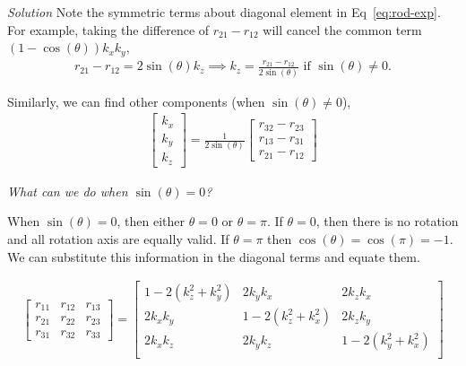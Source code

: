 \documentclass{article}
\numberwithin{prob}{section}
\newenvironment{solution}{\emph{Solution}}{}
\begin{document}
\begin{solution}
Note the symmetric terms about diagonal element in Eq~\eqref{eq:rod-exp}. For example, taking the difference of $r_{21} - r_{12}$ will cancel the common term $(1-\cos(\theta)) k_x k_y$,
\begin{align}
  r_{21} - r_{12} = 2\sin(\theta)k_z \implies k_z = \frac{r_{21} - r_{12}}{2\sin(\theta)} \text{ if } \sin(\theta) \neq 0.
\end{align}

Similarly, we can find other components (when $\sin(\theta) \neq 0$),
\begin{align}
  \begin{bmatrix}
    k_x \\ k_y \\ k_z
  \end{bmatrix} 
  = \frac{1}{2\sin(\theta)}\begin{bmatrix}
    r_{32} - r_{23} \\ r_{13} - r_{31} \\ r_{21} - r_{12}
  \end{bmatrix}
\end{align}

\emph{What can we do when $\sin(\theta) = 0$? }

When $\sin(\theta) = 0$, then either $\theta = 0$ or $\theta = \pi$. If $\theta = 0$, then there is no rotation and all rotation axis are equally valid. If $\theta = \pi$ then $\cos(\theta) = \cos(\pi) = -1$. We can substitute this information in the diagonal terms and equate them. 

\begin{align}
  \begin{bmatrix}
    r_{11} & r_{12} & r_{13}  \\
    r_{21} & r_{22} & r_{23}  \\
    r_{31} & r_{32} & r_{33}  
  \end{bmatrix}
  = \begin{bmatrix}
    1-2(k_z^2 + k_y^2) & 2k_yk_x & 2k_zk_x \\
    2k_x k_y & 1-2(k_z^2 + k_x^2) & 2k_zk_y \\
    2k_xk_z & 2k_y k_z & 1-2(k_y^2 + k_x^2) \\
  \end{bmatrix}
\end{align}


\end{solution}
\end{document}
